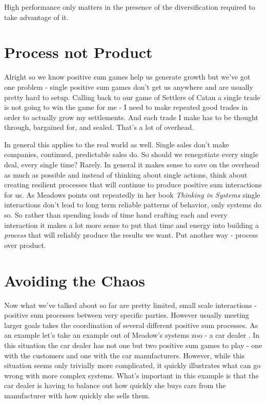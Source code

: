 \documentclass[11pt,a5paper]{book}
\begin{document}
High performance only matters in the presence of the diversification required to take advantage of it.

\section{Process not Product}
Alright so we know positive sum games help us generate growth but we've got one problem - single positive sum games don't get us anywhere and are usually pretty hard to setup. Calling back to our game of Settlers of Catan a single trade is not going to win the game for me - I need to make repeated good trades in order to actually grow my settlements. And each trade I make has to be thought through, bargained for, and sealed. That's a lot of overhead. 
\newline

In general this applies to the real world as well. Single sales don't make companies, continued, predictable sales do. So should we renegotiate every single deal, every single time? Rarely. In general it makes sense to save on the overhead as much as possible and instead of thinking about single actions, think about creating resilient processes that will continue to produce positive sum interactions for us. As Meadows points out repeatedly in her book \textit{Thinking in Systems} \cite{meadows} single interactions don't lead to long term reliable patterns of behavior, only systems do so. So rather than spending loads of time hand crafting each and every interaction it makes a lot more sense to put that time and energy into building a \textit{process} that will reliably produce the results we want. Put another way - process over product.

\section{Avoiding the Chaos}
Now what we've talked about so far are pretty limited, small scale interactions - positive sum processes between very specific parties. However usually meeting larger goals takes the coordination of several different positive sum processes. As an example let's take an example out of Meadow's systems zoo - a car dealer \cite{meadows}. In this situation the car dealer has not one but two positive sum games to play - one with the customers and one with the car manufacturers. However, while this situation seems only trivially more complicated, it quickly illustrates what can go wrong with more complex systems. What's important in this example is that the car dealer is having to balance out how quickly she buys cars from the manufacturer with how quickly she sells them.
\newline
\end{document}
